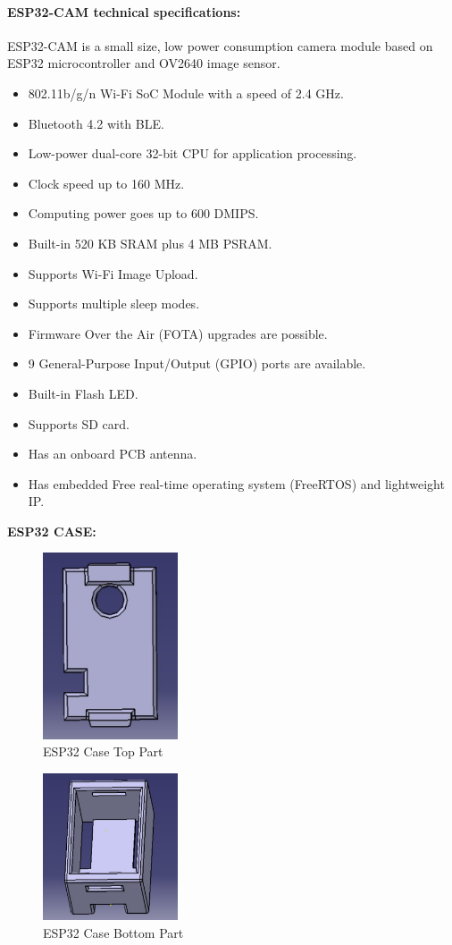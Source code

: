 \STANDARD{\insertsection}
{ 
	\framesubtitle{\insertsubsection}
	\framesubtitle{ESP32-CAM technical specifications:}
	ESP32-CAM is a small size, low power consumption camera module based on ESP32 microcontroller and OV2640 image sensor. \newline 
		\begin{itemize}
			\item 802.11b/g/n Wi-Fi SoC Module  with a speed of 2.4 GHz. 
			\item Bluetooth 4.2 with BLE. 
			\item Low-power dual-core 32-bit CPU for application processing.  
			\item Clock speed up to 160 MHz. 
			\item Computing power goes up to 600 DMIPS.
			\item Built-in 520 KB SRAM plus 4 MB PSRAM.
	\framebreak
			\item Supports Wi-Fi Image Upload.
			\item Supports multiple sleep modes.
			\item Firmware Over the Air (FOTA) upgrades are possible.
			\item 9 General-Purpose Input/Output (GPIO) ports are available.
			\item Built-in Flash LED.
			\item Supports SD card.
			\item Has an onboard PCB antenna.
			\item Has embedded Free real-time operating system (FreeRTOS) and lightweight IP.
		\end{itemize}
\pagebreak
\textbf{ESP32 CASE:}
\begin{figure}  [!h]
	\begin{center}
		\includegraphics[width=4cm]{images/CaseTopPart}
		\caption{ESP32 Case Top Part}
	\end{center}
\end{figure}
\begin{figure}  [!h]
	\begin{center}
		\includegraphics[width=4cm]{images/CaseBottomPart}
		\caption{ESP32 Case Bottom Part}
	\end{center}
\end{figure}
}

